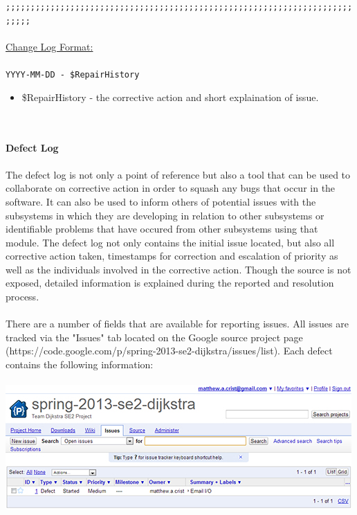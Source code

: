 \documentclass[11pt, letterpaper]{report}
\begin{document}
\begin{description}
\texttt{;;;;;;;;;;;;;;;;;;;;;;;;;;;;;;;;;;;;;;;;;;;;;;;;;;;;;;;;;;;;;;;;;;;;;;;;;;;} \hfill \\
\hfill \\
\underline{Change Log Format:} \hfill \\ \hfill \\
\texttt{YYYY-MM-DD - \$RepairHistory}
\begin{itemize}
	\item \$RepairHistory - the corrective action and short explaination of issue.
\end{itemize} \hfill \\ \hfill \\
\textbf{Defect Log} \hfill \\ \hfill \\
The defect log is not only a point of reference but also a tool that can be used to collaborate on corrective action in order to squash any bugs that occur in the software.  It can also be used to inform others of potential issues with the subsystems in which they are developing in relation to other subsystems or identifiable problems that have occured from other subsystems using that module.  The defect log not only contains the initial issue located, but also all corrective action taken, timestamps for correction and escalation of priority as well as the individuals involved in the corrective action.  Though the source is not exposed, detailed information is explained during the reported and resolution process.\hfill \\ \hfill \\
There are a number of fields that are available for reporting issues.  All issues are tracked via the "Issues" tab located on the Google source project page (https://code.google.com/p/spring-2013-se2-dijkstra/issues/list).  Each defect contains the following information:\hfill \\ \hfill \\
\includegraphics[width=500px,height=180px]{defect_list---defect-log}
\begin{itemize}

\end{itemize}
\end{description}
\end{document}
